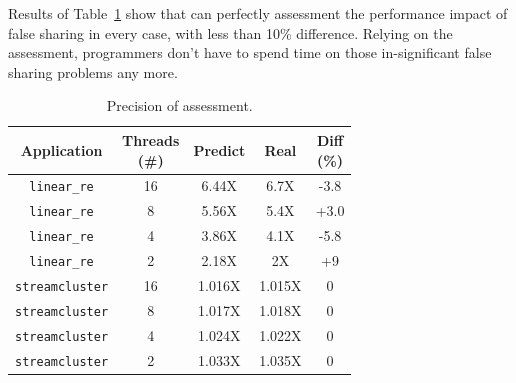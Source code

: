 Results of Table~\ref{tbl: precision} show that \cheetah{} can perfectly assessment the performance impact of false sharing in every case, with less than 10\% difference. Relying on the assessment, programmers don't have to spend time on those in-significant false sharing problems any more. 


\begin{table}
  \small
  \centering
  \begin{tabular}{ c | c | c | c | c}
  \textbf{Application} & \specialcell{Threads \\ (\#)} & \textbf{Predict} & \textbf{Real} & \specialcell{Diff \\ (\%)}\\ \hline
\texttt{linear\_re} & 16 & 6.44X    & 6.7X & {-3.8}\\
\texttt{linear\_re}& 8  & 5.56X    & 5.4X & {+3.0}\\
\texttt{linear\_re} & 4  & 3.86X  & 4.1X  & {-5.8}\\
 \texttt{linear\_re}& 2  & 2.18X  & 2X    & {+9}\\ \hline
 \texttt{streamcluster} & 16 & 1.016X    & 1.015X &  {0}\\
 \texttt{streamcluster} & 8 & 1.017X    & 1.018X & {0}\\
 \texttt{streamcluster} & 4 & 1.024X    & 1.022X & {0}\\
 \texttt{streamcluster} & 2 & 1.033X    & 1.035X & {0}
\end{tabular}
  \caption{
    Precision of assessment. \label{tbl: precision}}
\end{table}

